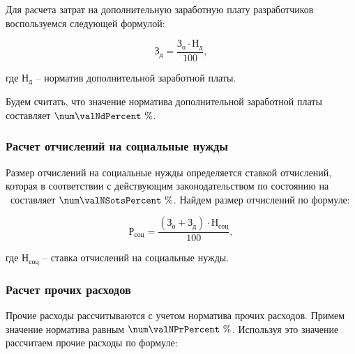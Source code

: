 
Для расчета затрат на дополнительную заработную плату разработчиков воспользуемся
следующей формулой:

\begin{equation}
  \label{eq:econ:Zd}
  \text{З}_\text{д} = \frac{\text{З}_\text{о} \cdot \text{Н}_\text{д}}
    {100},
\end{equation}
\begin{explanationx}
  \item[где] $ \text{Н}_\text{д} $ -- норматив дополнительной заработной платы.
\end{explanationx}

Будем считать, что значение норматива дополнительной заработной платы составляет $ \num\valNdPercent \ \% $.


\subsubsection{Расчет отчислений на социальные нужды}


Размер отчислений на социальные нужды определяется ставкой отчислений, которая
в соответствии с действующим законодательством по состоянию на \econCalcDate\
составляет $ \num\valNSotsPercent \ \% $. Найдем размер отчислений по формуле:

\begin{equation}
  \label{eq:econ:RSots}
  \text{Р}_\text{соц} = \frac{(\text{З}_\text{о} + \text{З}_\text{д}) \cdot \text{Н}_\text{соц}}
    {100},
\end{equation}
\begin{explanationx}
  \item[где] $ \text{Н}_\text{соц} $ -- ставка отчислений на социальные нужды.
\end{explanationx}


\subsubsection{Расчет прочих расходов}


Прочие расходы рассчитываются с учетом норматива прочих расходов. Примем значение
норматива равным $ \num\valNPrPercent \ \% $. Используя это значение рассчитаем прочие расходы
по формуле:

